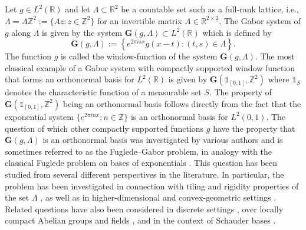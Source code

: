 \documentclass[reqno,a4paper,12pt]{amsart}
\numberwithin{equation}{section}
\def\Z{{\mathbb Z}}
\def\R{{\mathbb R}}
\newcommand{\lt}{{L^2(\R)}}
\newcommand\1{\mathds{1}}
\begin{document}
\subsection{}
Let $g \in \lt$ and let $\Lambda \subset \R^2$ be a countable set such as a full-rank lattice, i.e., $\Lambda = A\Z^2 := \{ Az : z \in \Z^2 \}$ for an invertible matrix $A \in \R^{2 \times 2}$. The Gabor system of $g$ along $\Lambda$ is given by the system $\mathbf G(g,\Lambda) \subset \lt$ which is defined by
$$
\mathbf G(g,\Lambda) := \left \{ e^{2\pi i s x} g(x-t) : (t,s) \in \Lambda 
 \right \}.
$$
The function $g$ is called the window-function of the system $\mathbf G(g,\Lambda)$.
The most classical example of a Gabor system with compactly supported window function that forms an orthonormal basis for $\lt$ is given by $\mathbf G(\1_{[0,1]},\Z^2)$ where $\1_S$ denotes the characteristic function of a measurable set $S$. The property of $\mathbf G(\1_{[0,1]},\Z^2)$ being an orthonormal basis follows directly from the fact that the exponential system $\{ e^{2\pi i n x} : n \in \Z \}$ is an orthonormal basis for $L^2(0,1)$. The question of which other compactly supported functions $g$ have the property that $\mathbf G(g,\Lambda)$ is an orthonormal basis was investigated by various authors \cite{L05,AAK20,DL22,HW01,grepstad2026bounded} and is sometimes referred to as the Fuglede--Gabor problem, in analogy with the classical Fuglede problem on bases of exponentials \cite{fuglede1974commuting,tao2004fuglede,lev2022fuglede,greenfeld2017fuglede}.
This question has been studied from several different perspectives in the literature. In particular, the problem has been investigated in connection with tiling and rigidity properties of the set $\Lambda$ \cite{HW01,HW04,LW03,LM19,AAK20,DL22,GLW15,grepstad2026bounded}, as well as in higher-dimensional and convex-geometric settings \cite{GLW15,BO18,CL18,IM18}. Related questions have also been considered in discrete settings \cite{Z21}, over locally compact Abelian groups and fields \cite{IKL21,N24}, and in the context of Schauder bases \cite{BM21,HP06,LT26}.
\end{document}
